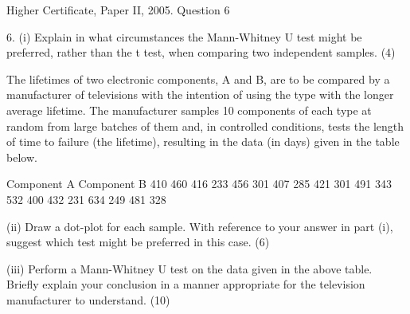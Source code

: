\documentclass[a4paper,12pt]{article}
\begin{document}
Higher Certificate, Paper II, 2005. Question 6
\begin{framed}
 
6. (i) Explain in what circumstances the Mann-Whitney U test might be preferred, rather than the t test, when comparing two independent samples. (4) 
 
 
The lifetimes of two electronic components, A and B, are to be compared by a manufacturer of televisions with the intention of using the type with the longer average lifetime.  The manufacturer samples 10 components of each type at random from large batches of them and, in controlled conditions, tests the length of time to failure (the lifetime), resulting in the data (in days) given in the table below. 
 
Component A Component B 410 460 416 233 456 301 407 285 421 301 491 343 532 400 432 231 634 249 481 328 
 
 
(ii) Draw a dot-plot for each sample.  With reference to your answer in part (i), suggest which test might be preferred in this case. (6) 
 
(iii) Perform a Mann-Whitney U test on the data given in the above table.  Briefly explain your conclusion in a manner appropriate for the television manufacturer to understand. (10) 
 
 
\end{framed}
\end{document}
